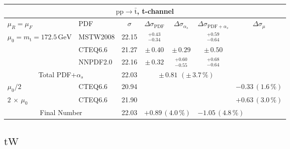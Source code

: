 \begin{table}[htb]
  \begin{center}
    \begin{tabular}{|l|l|c|c|c|c|c|}
      \hline

      \multicolumn{7}{|c|}{$\mathrm{pp}\to\bar{\mathrm{t}}$, t-channel} \\ \hline
      $\mu_R=\mu_F$ & PDF & $\sigma$ & $\Delta\sigma_{\mathrm{PDF}}$ & $\Delta\sigma_{\alpha_s}$ & $\Delta\sigma_{\mathrm{PDF}+\alpha_s}$ & $\Delta\sigma_{\mu}$ \\ \hline\hline

      $\mu_0=m_\mathrm{t}=172.5\,\mathrm{GeV}$ & MSTW2008 & 22.15 & $^{+0.43}_{-0.34}$ &     &  $^{+0.59}_{-0.64}$    &     \\
                                                & CTEQ6.6  & 21.27 & $\pm\,0.40$ &  $\pm\,0.29$  &  $\pm\,0.50$       &     \\
                                                & NNPDF2.0 & 22.16 & $\pm\,0.32$ &  $^{+0.60}_{-0.55}$  & $^{+0.68}_{-0.64}$     &     \\ \hline\hline
      \multicolumn{2}{|c|}{Total PDF+$\alpha_s$}      &  22.03    & \multicolumn{3}{c|}{$\pm\,0.81\,\,(\pm\,3.7\,\%)$} & \\ \hline\hline
      $\mu_0/2$                                 & CTEQ6.6 & 20.94 & \multicolumn{3}{c|}{} & $-0.33\,(1.6\,\%)$ \\ 
      $2\,\times\,\mu_0$                        & CTEQ6.6 & 21.90 & \multicolumn{3}{c|}{} & $+0.63\,(3.0\,\%)$ \\  \hline\hline
      \multicolumn{2}{|c|}{Final Number} & 22.03  & \multicolumn{2}{l}{$+0.89\,(4.0\,\%)$} & \multicolumn{2}{l|}{$-1.05\,(4.8\,\%)$} \\


\hline 
\end{tabular}
\end{center}
\end{table} 
 

\subsection*{\boldmath $\mathrm{tW}$}



